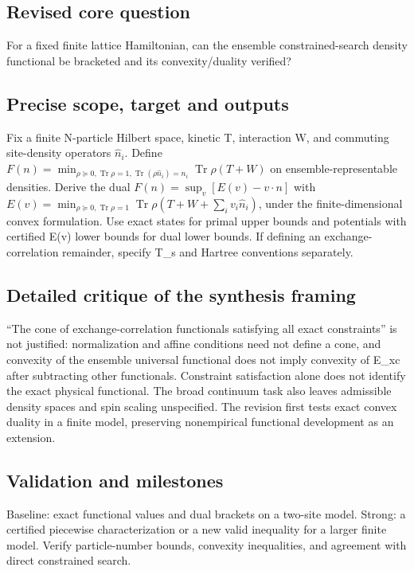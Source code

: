 \documentclass[
  11pt,
]{article}
\newcounter{none} %
\begin{document}
\subsection{Revised core question}

For a fixed finite lattice Hamiltonian, can the ensemble
constrained-search density functional be bracketed and its
convexity/duality verified?

\subsection{Precise scope, target and outputs}

Fix a finite N-particle Hilbert space, kinetic T, interaction W, and
commuting site-density operators \(\widehat n_i\). Define
\(F(n)=\min_{\rho\succeq0,\operatorname{Tr}\rho=1,\operatorname{Tr}(\rho\widehat n_i)=n_i}\operatorname{Tr}\rho(T+W)\)
on ensemble-representable densities. Derive the dual
\(F(n)=\sup_v[E(v)-v\cdot n]\) with
\(E(v)=\min_{\rho\succeq0,\operatorname{Tr}\rho=1}\operatorname{Tr}\rho(T+W+\sum_i v_i\widehat n_i)\),
under the finite-dimensional convex formulation. Use exact states for
primal upper bounds and potentials with certified E(v) lower bounds for
dual lower bounds. If defining an exchange-correlation remainder,
specify T\_s and Hartree conventions separately.

\subsection{Detailed critique of the synthesis framing}

``The cone of exchange-correlation functionals satisfying all exact
constraints'' is not justified: normalization and affine conditions need
not define a cone, and convexity of the ensemble universal functional
does not imply convexity of E\_xc after subtracting other functionals.
Constraint satisfaction alone does not identify the exact physical
functional. The broad continuum task also leaves admissible density
spaces and spin scaling unspecified. The revision first tests exact
convex duality in a finite model, preserving nonempirical functional
development as an extension.

\subsection{Validation and milestones}

Baseline: exact functional values and dual brackets on a two-site model.
Strong: a certified piecewise characterization or a new valid inequality
for a larger finite model. Verify particle-number bounds, convexity
inequalities, and agreement with direct constrained search.
\end{document}
